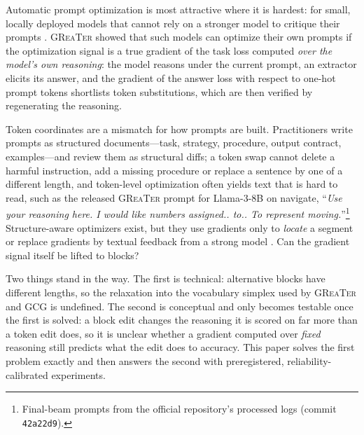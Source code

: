 \documentclass{article}
\newcommand{\greater}{\textsc{GReaTer}}
\begin{document}
Automatic prompt optimization is most attractive where it is hardest: for small,
locally deployed models that cannot rely on a stronger model to critique their
prompts \citep{zhang2024revisiting}. \greater{} \citep{das2025greater} showed that such
models can optimize their own prompts if the optimization signal is a true gradient of
the task loss computed \emph{over the model's own reasoning}: the model reasons under
the current prompt, an extractor elicits its answer, and the gradient of the answer
loss with respect to one-hot prompt tokens shortlists token substitutions, which are
then verified by regenerating the reasoning.

Token coordinates are a mismatch for how prompts are built. Practitioners write
prompts as structured documents---task, strategy, procedure, output contract,
examples---and review them as structural diffs; a token swap cannot delete a harmful
instruction, add a missing procedure or replace a sentence by one of a different
length, and token-level optimization often yields text that is hard to read, such as
the released \greater{} prompt for Llama-3-8B on navigate, ``\emph{Use your reasoning
here. I would like numbers assigned.. to.. To represent moving.}''\footnote{Final-beam
prompts from the official repository's processed logs (commit \texttt{42a22d9}).}
Structure-aware optimizers exist, but they use gradients only to \emph{locate} a
segment \citep{zhao2026gmpo,chakma2026gradpo} or replace gradients by textual feedback
from a strong model \citep{yuksekgonul2024textgrad,sharma2026mpo,agrawal2026gepa}. Can
the gradient signal itself be lifted to blocks?

Two things stand in the way. The first is technical: alternative blocks have different
lengths, so the relaxation into the vocabulary simplex used by \greater{} and GCG
\citep{zou2023gcg} is undefined. The second is conceptual and only becomes testable once
the first is solved: a block edit changes the reasoning it is scored on far more than a
token edit does, so it is unclear whether a gradient computed over \emph{fixed}
reasoning still predicts what the edit does to accuracy. This paper solves the first
problem exactly and then answers the second with preregistered, reliability-calibrated
experiments.
\end{document}
